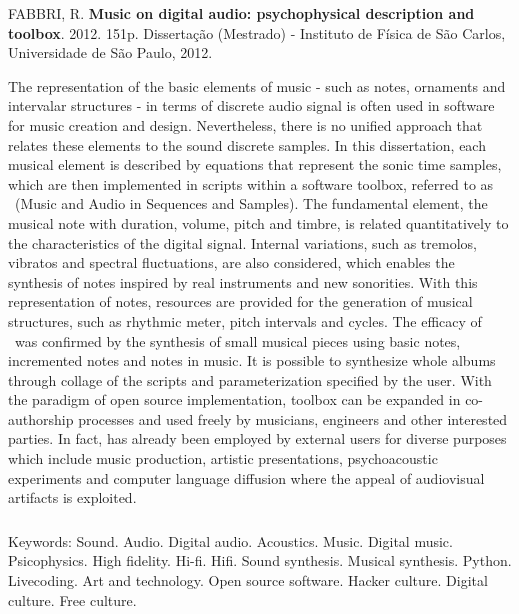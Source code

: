\afterpage{\blankpage}

\begin{abstract2}
\vspace{-10mm}
FABBRI, R. \textbf{Music on digital audio: psychophysical description and toolbox}. 2012. 151p. Dissertação (Mestrado) - Instituto de Física de São Carlos, Universidade de São Paulo, 2012.
\vspace{15mm}

The representation of the basic elements of music - such as notes, ornaments and intervalar structures - in terms of discrete audio signal is often used in software for music creation and design. Nevertheless, there is no unified approach that relates these elements to the sound discrete samples. In this dissertation, each musical element is described by equations that represent the sonic time samples, which are then implemented in scripts within a software toolbox, referred to as \massa\ (Music and Audio in Sequences and Samples). The fundamental element, the musical note with duration, volume, pitch and timbre, is related quantitatively to the characteristics of the digital signal. Internal variations, such as tremolos, vibratos and spectral fluctuations, are also considered, which enables the synthesis of notes inspired by real instruments and new sonorities. With this representation of notes, resources are provided for the generation of musical structures, such as rhythmic meter, pitch intervals and cycles. The efficacy of \massa\ was confirmed by the synthesis of small musical pieces using basic notes, incremented notes and notes in music. It is possible to synthesize whole albums through collage of the scripts and parameterization specified by the user. With the paradigm of open source implementation, \massa toolbox can be expanded in co-authorship processes and used freely by musicians, engineers and other interested parties. In fact, \massa has already been employed by external users for diverse purposes which include music production, artistic presentations, psychoacoustic experiments and computer language diffusion where the appeal of audiovisual artifacts is exploited.


$\phantom{linha em branco}$\\
Keywords: Sound. Audio. Digital audio. Acoustics. Music. Digital music. Psicophysics. High fidelity. Hi-fi. Hifi. Sound synthesis. Musical synthesis. Python. Livecoding. Art and technology. Open source software. Hacker culture. Digital culture. Free culture.


\end{abstract2}
